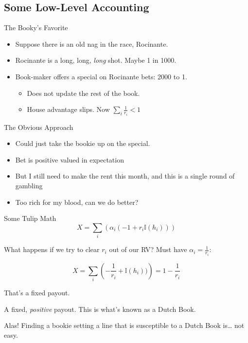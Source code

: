 \documentclass[pdf]{beamer}
\begin{document}
\subsection{Some Low-Level Accounting}
\begin{frame}{The Booky's Favorite}
  \begin{itemize}
  \item Suppose there is an old nag in the race, Rocinante.
  \item Rocinante is a long, long, \emph{long} shot. Maybe 1 in 1000.
  \item Book-maker offers a special on Rocinante bets: 2000 to 1.
    \begin{itemize}
    \item Does not update the rest of the book.
    \item House advantage slips. Now $\sum_i \frac{1}{r_i} < 1$
    \end{itemize}
  \end{itemize}
\end{frame}

\begin{frame}{The Obvious Approach}
  \begin{itemize}
  \item Could just take the bookie up on the special.
  \item Bet is positive valued in expectation
  \item But I still need to make the rent this month, and this is a single round of gambling
  \item Too rich for my blood, can we do better?
  \end{itemize}
\end{frame}

\begin{frame}{Some Tulip Math}
  \[ X = \sum_i \left( \alpha_i (-1 + r_i\mathbb{I}(h_i)) \right) \]

  What happens if we try to clear $r_i$ out of our RV? Must have $\alpha_i = \frac{1}{r_i}$:

  \[ X = \sum_i \left( -\frac{1}{r_i} + \mathbb{I}(h_i)) \right) = 1 - \frac{1}{r_i}\]

  \pause

  That's a fixed payout.

  \pause

  A fixed, \emph{positive} payout. This is what's known as a Dutch Book.
\end{frame}

\begin{frame}{Alas!}
  Finding a bookie setting a line that is susceptible to a Dutch Book is\ldots
  not easy.
\end{frame}
\end{document}

